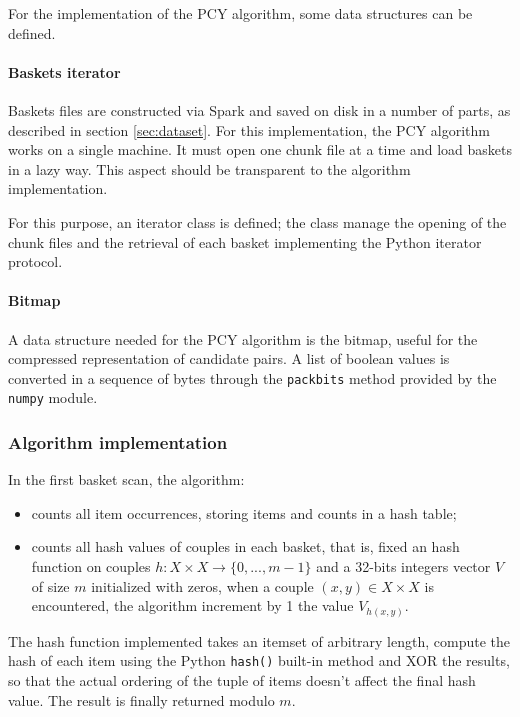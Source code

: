\documentclass{article}
\begin{document}
For the implementation of the PCY algorithm, some data structures can be defined. 

\paragraph{Baskets iterator}

Baskets files are constructed via Spark and saved on disk in a number of parts, as described in section \ref{sec:dataset}. For this implementation, the PCY algorithm works on a single machine. It must open one chunk file at a time and load baskets in a lazy way. This aspect should be transparent to the algorithm implementation. 

For this purpose, an iterator class is defined; the class manage the opening of the chunk files and the retrieval of each basket implementing the Python iterator protocol.

\paragraph{Bitmap} 
A data structure needed for the PCY algorithm is the bitmap, useful for the compressed representation of candidate pairs. A list of boolean values is converted in a sequence of bytes through the \texttt{packbits} method provided by the \texttt{numpy} module.

\subsubsection{Algorithm implementation}

In the first basket scan, the algorithm:
\begin{itemize}
	\item counts all item occurrences, storing items and counts in a hash table;
	\item counts all hash values of couples in each basket, that is, fixed an hash function on couples $h: X \times X \rightarrow \{0, ..., m-1\}$ and a 32-bits integers vector $V$ of size $m$ initialized with zeros, when a couple $(x, y)\in X\times X$ is encountered, the algorithm increment by 1 the value $V_{h(x,y)}$.
\end{itemize}
The hash function implemented takes an itemset of arbitrary length, compute the hash of each item using the Python \texttt{hash()} built-in method and XOR the results, so that the actual ordering of the tuple of items doesn't affect the final hash value. The result is finally returned modulo $m$.
\end{document}

